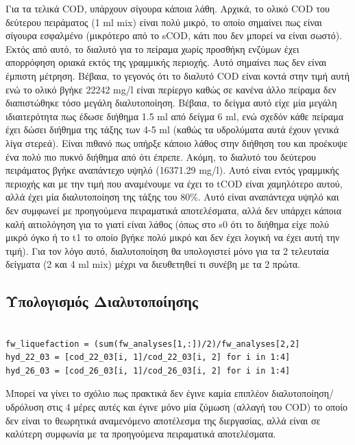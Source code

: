 \documentclass[11pt]{article}
\begin{document}
Για τα τελικά COD, υπάρχουν σίγουρα κάποια λάθη. Αρχικά, το ολικό COD του δεύτερου πειράματος (1 ml mix) είναι πολύ μικρό, το οποίο σημαίνει πως είναι σίγουρα εσφαλμένο (μικρότερο από το sCOD, κάτι που δεν μπορεί να είναι σωστό). Εκτός από αυτό, το διαλυτό για το πείραμα χωρίς προσθήκη ενζύμων έχει απορρόφηση οριακά εκτός της γραμμικής περιοχής. Αυτό σημαίνει πως δεν είναι έμπιστη μέτρηση. Βέβαια, το γεγονός ότι το διαλυτό COD είναι κοντά στην τιμή αυτή ενώ το ολικό βγήκε 22242 mg/l είναι περίεργο καθώς σε κανένα άλλο πείραμα δεν διαπιστώθηκε τόσο μεγάλη διαλυτοποίηση. Βέβαια, το δείγμα αυτό είχε μία μεγάλη ιδιαιτερότητα πως έδωσε διήθημα 1.5 ml από δείγμα 6 ml, ενώ σχεδόν κάθε πείραμα έχει δώσει διήθημα της τάξης των 4-5 ml (καθώς τα υδρολύματα αυτά έχουν γενικά λίγα στερεά). Είναι πιθανό πως υπήρξε κάποιο λάθος στην διήθηση του και προέκυψε ένα πολύ πιο πυκνό διήθημα από ότι έπρεπε. Ακόμη, το διαλυτό του δεύτερου πειράματος βγήκε αναπάντεχο υψηλό (16371.29 mg/l). Αυτό είναι εντός γραμμικής περιοχής και με την τιμή που αναμένουμε να έχει το tCOD είναι χαμηλότερο αυτού, αλλά έχει μία διαλυτοποίηση της τάξης του 80\%. Αυτό είναι αναπάντεχα υψηλό και δεν συμφωνεί με προηγούμενα πειραματικά αποτελέσματα, αλλά δεν υπάρχει κάποια καλή αιτιολόγηση για το γιατί είναι λάθος (όπως στο s0 ότι το διήθημα είχε πολύ μικρό όγκο ή το t1 το οποίο βγήκε πολύ μικρό και δεν έχει λογική να έχει αυτή την τιμή). Για τον λόγο αυτό, διαλυτοποίηση θα υπολογιστεί μόνο για τα 2 τελευταία δείγματα (2 και 4 ml mix) μέχρι να διευθετηθεί τι συνέβη με τα 2 πρώτα.

\subsection{Υπολογισμός Διαλυτοποίησης}
\label{sec:org75f6d54}
\begin{verbatim}

fw_liquefaction = (sum(fw_analyses[1,:])/2)/fw_analyses[2,2]
hyd_22_03 = [cod_22_03[i, 1]/cod_22_03[i, 2] for i in 1:4]
hyd_26_03 = [cod_26_03[i, 1]/cod_26_03[i, 2] for i in 1:4]

\end{verbatim}

Μπορεί να γίνει το σχόλιο πως πρακτικά δεν έγινε καμία επιπλέον διαλυτοποίηση/υδρόλυση στις 4 μέρες αυτές και έγινε μόνο μία ζύμωση (αλλαγή του COD) το οποίο δεν είναι το θεωρητικά αναμενόμενο αποτέλεσμα της διεργασίας, αλλά είναι σε καλύτερη συμφωνία με τα προηγούμενα πειραματικά αποτελέσματα.
\end{document}
